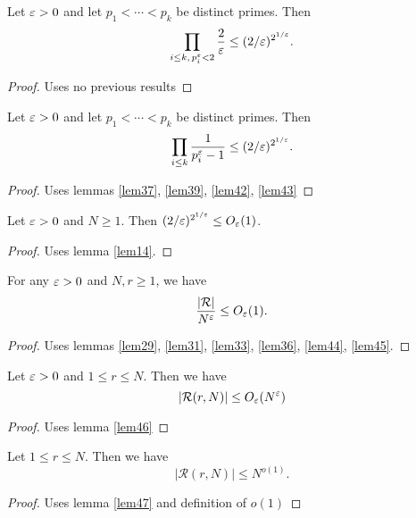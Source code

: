 \begin{lemma} \label{lem43} 
Let $\varepsilon>0$ and let $p_1<\cdots<p_k$ be distinct primes. Then
\[
\prod_{i\le k, \, p_i^{\varepsilon}< 2} \frac{2}{\varepsilon} \le (2/\varepsilon)^{2^{1/\varepsilon}}.
\]
\end{lemma}
\begin{proof}\leanok
\uses{}
Uses no previous results
\end{proof}

\begin{lemma} \label{lem44} 
Let $\varepsilon>0$ and let $p_1<\cdots<p_k$ be distinct primes. Then
\[
\prod_{i\le k} \frac{1}{p_i^\varepsilon-1} \le (2/\varepsilon)^{2^{1/\varepsilon}}.
\]
\end{lemma}
\begin{proof}\leanok
{}
Uses lemmas \ref{lem37}, \ref{lem39}, \ref{lem42}, \ref{lem43}
\end{proof}

\begin{lemma} \label{lem45} 
Let $\varepsilon>0$ and $N\ge1$. Then $(2/\varepsilon)^{2^{1/\varepsilon}}  \le O_\varepsilon(1)$.
\end{lemma}
\begin{proof}\leanok
{}
Uses lemma \ref{lem14}.
\end{proof}


\begin{lemma} \label{lem46} 
For any $\varepsilon>0$ and $N,r\ge1$, we have
\[
\frac{|\mathcal{R}|}{N^\varepsilon} \le O_\varepsilon(1).
\]
\end{lemma}
\begin{proof}\leanok
{}
Uses lemmas \ref{lem29}, \ref{lem31}, \ref{lem33}, \ref{lem36}, \ref{lem44}, \ref{lem45}.
\end{proof}

\begin{lemma} \label{lem47} 
Let $\varepsilon>0$ and $1\le r\le N$. Then we have
\[
|\mathcal{R}(r,N)| \le O_\varepsilon(N^\varepsilon)
\]
\end{lemma}
\begin{proof}\leanok
{}
Uses lemma \ref{lem46}
\end{proof}


\begin{theorem} \label{lem:radical} \label{thm48} 
Let $1\le r\le N$. Then we have
\[
|\mathcal{R}(r,N)| \le N^{o(1)}.
\]
\end{theorem}
\begin{proof}\leanok
{}
Uses lemma \ref{lem47} and definition of $o(1)$
\end{proof}

